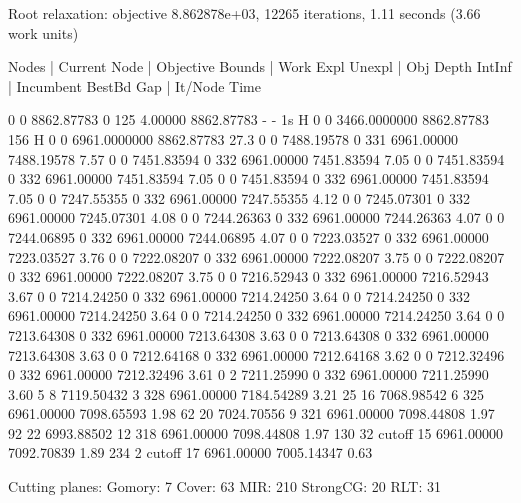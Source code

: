 Root relaxation: objective 8.862878e+03, 12265 iterations, 1.11 seconds (3.66 work units)

    Nodes    |    Current Node    |     Objective Bounds      |     Work
 Expl Unexpl |  Obj  Depth IntInf | Incumbent    BestBd   Gap | It/Node Time

     0     0 8862.87783    0  125    4.00000 8862.87783      -     -    1s
H    0     0                    3466.0000000 8862.87783   156%
H    0     0                    6961.0000000 8862.87783  27.3%
     0     0 7488.19578    0  331 6961.00000 7488.19578  7.57%
     0     0 7451.83594    0  332 6961.00000 7451.83594  7.05%
     0     0 7451.83594    0  332 6961.00000 7451.83594  7.05%
     0     0 7451.83594    0  332 6961.00000 7451.83594  7.05%
     0     0 7247.55355    0  332 6961.00000 7247.55355  4.12%
     0     0 7245.07301    0  332 6961.00000 7245.07301  4.08%
     0     0 7244.26363    0  332 6961.00000 7244.26363  4.07%
     0     0 7244.06895    0  332 6961.00000 7244.06895  4.07%
     0     0 7223.03527    0  332 6961.00000 7223.03527  3.76%
     0     0 7222.08207    0  332 6961.00000 7222.08207  3.75%
     0     0 7222.08207    0  332 6961.00000 7222.08207  3.75%
     0     0 7216.52943    0  332 6961.00000 7216.52943  3.67%
     0     0 7214.24250    0  332 6961.00000 7214.24250  3.64%
     0     0 7214.24250    0  332 6961.00000 7214.24250  3.64%
     0     0 7214.24250    0  332 6961.00000 7214.24250  3.64%
     0     0 7213.64308    0  332 6961.00000 7213.64308  3.63%
     0     0 7213.64308    0  332 6961.00000 7213.64308  3.63%
     0     0 7212.64168    0  332 6961.00000 7212.64168  3.62%
     0     0 7212.32496    0  332 6961.00000 7212.32496  3.61%
     0     2 7211.25990    0  332 6961.00000 7211.25990  3.60%
     5     8 7119.50432    3  328 6961.00000 7184.54289  3.21%
    25    16 7068.98542    6  325 6961.00000 7098.65593  1.98%
    62    20 7024.70556    9  321 6961.00000 7098.44808  1.97%
    92    22 6993.88502   12  318 6961.00000 7098.44808  1.97%
   130    32     cutoff   15      6961.00000 7092.70839  1.89%
   234     2     cutoff   17      6961.00000 7005.14347  0.63%

Cutting planes:
  Gomory: 7
  Cover: 63
  MIR: 210
  StrongCG: 20
  RLT: 31

